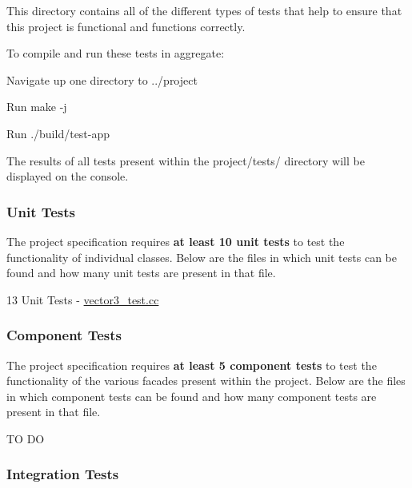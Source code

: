 This directory contains all of the different types of tests that help to ensure that this project is functional and functions correctly.

To compile and run these tests in aggregate\+:
\begin{DoxyEnumerate}
\item Navigate up one directory to {\ttfamily ../project}
\end{DoxyEnumerate}
\begin{DoxyEnumerate}
\item Run {\ttfamily make -\/j}
\end{DoxyEnumerate}
\begin{DoxyEnumerate}
\item Run {\ttfamily ./build/test-\/app}
\end{DoxyEnumerate}

The results of all tests present within the {\ttfamily project/tests/} directory will be displayed on the console.

\subsubsection*{Unit Tests}

The project specification requires {\bfseries at least 10 unit tests} to test the functionality of individual classes. Below are the files in which unit tests can be found and how many unit tests are present in that file.
\begin{DoxyItemize}
\item 13 Unit Tests -\/ {\ttfamily \hyperlink{vector3__test_8cc}{vector3\+\_\+test.\+cc}}
\end{DoxyItemize}

\subsubsection*{Component Tests}

The project specification requires {\bfseries at least 5 component tests} to test the functionality of the various facades present within the project. Below are the files in which component tests can be found and how many component tests are present in that file.
\begin{DoxyItemize}
\item TO DO
\end{DoxyItemize}

\subsubsection*{Integration Tests}

